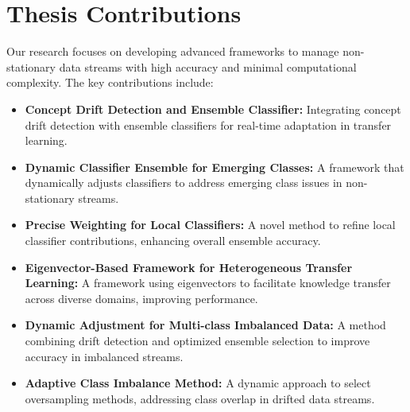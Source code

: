\section{Thesis Contributions}
\label{sec:1_introduction_contribution}

Our research focuses on developing advanced frameworks to manage non-stationary data streams with high accuracy and minimal computational complexity. The key contributions include:

\begin{itemize}
    \setlength{\itemsep}{0pt}
    \setlength{\parskip}{0pt}
    \item \textbf{Concept Drift Detection and Ensemble Classifier:} Integrating concept drift detection with ensemble classifiers for real-time adaptation in transfer learning.
    \item \textbf{Dynamic Classifier Ensemble for Emerging Classes:} A framework that dynamically adjusts classifiers to address emerging class issues in non-stationary streams.
    \item \textbf{Precise Weighting for Local Classifiers:} A novel method to refine local classifier contributions, enhancing overall ensemble accuracy.
    \item \textbf{Eigenvector-Based Framework for Heterogeneous Transfer Learning:} A framework using eigenvectors to facilitate knowledge transfer across diverse domains, improving performance.
    \item \textbf{Dynamic Adjustment for Multi-class Imbalanced Data:} A method combining drift detection and optimized ensemble selection to improve accuracy in imbalanced streams.
    \item \textbf{Adaptive Class Imbalance Method:} A dynamic approach to select oversampling methods, addressing class overlap in drifted data streams.
\end{itemize}

